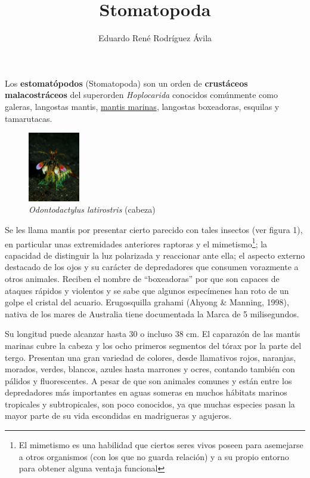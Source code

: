 \documentclass[10pt,twocolumn]{article}
\title{Stomatopoda}
\author{Eduardo René Rodríguez Ávila}
\begin{document}
\maketitle

Los \textbf{estomatópodos} (Stomatopoda) son un or\-den de \textbf{crustáceos malacostráceos} del superorden \textit{Hoplocarida}\cite{martin_updated_2001} conocidos comúnmente como galeras, langostas mantis, \underline{mantis marinas}, langostas boxeadoras, esquilas y tamarutacas.

\begin{figure}[h] 
	\centering
	\includegraphics[width=0.2\textwidth]{img/stomatopoda.jpg}
	\caption{\textit{Odontodactylus latirostris} (cabeza)}
\end{figure}

Se les llama mantis por presentar cierto parecido con tales insectos (ver figura 1), en particular unas extremidades anteriores raptoras y el mimetismo\footnote{El mimetismo es una habilidad que ciertos seres vivos poseen para asemejarse a otros organismos (con los que no guarda relación) y a su propio entorno para obtener alguna ventaja funcional}; la capacidad de distinguir la luz polarizada y reaccionar ante ella; el aspecto externo destacado de los ojos y su carácter de depredadores que consumen vorazmente a otros animales. Reciben el nombre de ``boxeadoras'' por que son capaces de ataques rápidos y violentos y se sabe que algunos especímenes han roto de un golpe el cristal del acuario.\cite{holladay_shrimp_2006} Erugosquilla grahami (Ahyong \& Manning, 1998), nativa de los mares de Australia tiene documentada la Marca de 5 mi\-li\-se\-gun\-dos.



Su longitud puede alcanzar hasta 30 o incluso 38 cm\cite{gonser_large_2007}. El caparazón de las mantis marinas cubre la cabeza y los ocho primeros segmentos del tórax por la parte del tergo. Presentan una gran variedad de colores, desde llamativos rojos, naranjas, morados, verdes, blancos, azules hasta marrones y ocres, contando también con pálidos y fluorescentes. A pesar de que son animales comunes y están entre los depredadores más importantes en aguas someras en muchos hábitats marinos tropicales y subtropicales, son poco co\-no\-ci\-dos, ya que muchas especies pasan la mayor parte de su vida escondidas en madrigueras y agujeros.\cite{piper_extraordinary_2007}
\end{document}
